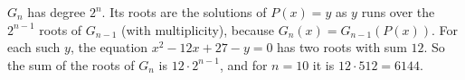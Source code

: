 $G_n$ has degree $2^n$. Its roots are the solutions of $P(x)=y$ as $y$ runs over the $2^{n-1}$ roots of $G_{n-1}$ (with multiplicity), because $G_n(x)=G_{n-1}(P(x))$. For each such $y$, the equation $x^2-12x+27-y=0$ has two roots with sum $12$. So the sum of the roots of $G_n$ is $12\cdot2^{n-1}$, and for $n=10$ it is $12\cdot512=\boxed{6144}$.
